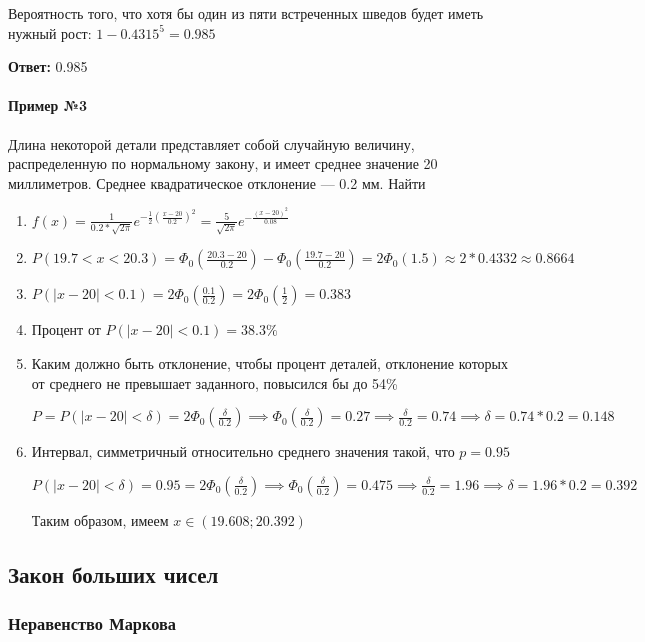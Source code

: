 \documentclass{article}
\begin{document}
Вероятность того, что хотя бы один из пяти встреченных шведов будет иметь нужный рост: $1 - 0.4315^5 = 0.985$

\textbf{Ответ:} 0.985

\paragraph{Пример №3}

Длина некоторой детали представляет собой случайную величину, распределенную по нормальному закону, и имеет среднее значение 20 миллиметров. Среднее квадратическое отклонение — 0.2 мм. Найти

\begin{enumerate}
    \item $f(x) = \frac{1}{0.2 * \sqrt{2\pi}} e^{-\frac{1}{2} (\frac{x - 20}{0.2})^2} = \frac{5}{\sqrt{2 \pi}} e^{-\frac{(x - 20)^2}{0.08}}$
    \item $P(19.7 < x < 20.3) = \Phi_0 (\frac{20.3 - 20}{0.2}) - \Phi_0 (\frac{19.7 - 20}{0.2}) = 2 \Phi_0(1.5) \approx 2 * 0.4332 \approx 0.8664$
    \item $P(|x - 20| < 0.1) = 2 \Phi_0 (\frac{0.1}{0.2}) = 2 \Phi_0 (\frac{1}{2}) = 0.383$
    \item Процент от $P(|x - 20| < 0.1) = 38.3\%$
    \item Каким должно быть отклонение, чтобы процент деталей, отклонение которых от среднего не превышает заданного, повысился бы до 54\%

    $P = P(|x - 20| < \delta) = 2 \Phi_0 (\frac{\delta}{0.2}) \implies \Phi_0 (\frac{\delta}{0.2}) = 0.27 \implies \frac{\delta}{0.2} = 0.74 \implies \delta = 0.74 * 0.2 = 0.148$
    \item Интервал, симметричный относительно среднего значения такой, что $p = 0.95$
    
    $P(|x - 20| < \delta) = 0.95 = 2 \Phi_0 (\frac{\delta}{0.2}) \implies \Phi_0 (\frac{\delta}{0.2}) = 0.475 \implies \frac{\delta}{0.2} = 1.96 \implies \delta = 1.96 * 0.2 = 0.392$

    Таким образом, имеем $x \in (19.608; 20.392)$
\end{enumerate}

\subsection{Закон больших чисел}

\subsubsection{Неравенство Маркова}
\end{document}
